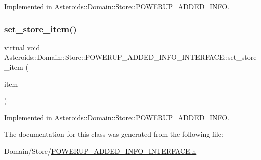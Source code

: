 Implemented in \hyperlink{classAsteroids_1_1Domain_1_1Store_1_1POWERUP__ADDED__INFO_afe8099b9e4266e1dd30e9d2908c17381}{Asteroids\+::\+Domain\+::\+Store\+::\+P\+O\+W\+E\+R\+U\+P\+\_\+\+A\+D\+D\+E\+D\+\_\+\+I\+N\+FO}.

\mbox{\label{classAsteroids_1_1Domain_1_1Store_1_1POWERUP__ADDED__INFO__INTERFACE_a16f5e557d71b54dc716863d619bd1549}} 
\subsubsection{\texorpdfstring{set\+\_\+store\+\_\+item()}{set\_store\_item()}}
{\footnotesize\ttfamily virtual void Asteroids\+::\+Domain\+::\+Store\+::\+P\+O\+W\+E\+R\+U\+P\+\_\+\+A\+D\+D\+E\+D\+\_\+\+I\+N\+F\+O\+\_\+\+I\+N\+T\+E\+R\+F\+A\+C\+E\+::set\+\_\+store\+\_\+item (\begin{DoxyParamCaption}\item[{std\+::shared\+\_\+ptr$<$ \hyperlink{classAsteroids_1_1Domain_1_1Store_1_1STORE__ITEM__INTERFACE}{Asteroids\+::\+Domain\+::\+Store\+::\+S\+T\+O\+R\+E\+\_\+\+I\+T\+E\+M\+\_\+\+I\+N\+T\+E\+R\+F\+A\+CE} $>$}]{item }\end{DoxyParamCaption})\hspace{0.3cm}{\ttfamily [pure virtual]}}



Implemented in \hyperlink{classAsteroids_1_1Domain_1_1Store_1_1POWERUP__ADDED__INFO_ad2b9413bde9663792a39c4bff9503ecf}{Asteroids\+::\+Domain\+::\+Store\+::\+P\+O\+W\+E\+R\+U\+P\+\_\+\+A\+D\+D\+E\+D\+\_\+\+I\+N\+FO}.



The documentation for this class was generated from the following file\+:\begin{DoxyCompactItemize}
\item 
Domain/\+Store/\hyperlink{POWERUP__ADDED__INFO__INTERFACE_8h}{P\+O\+W\+E\+R\+U\+P\+\_\+\+A\+D\+D\+E\+D\+\_\+\+I\+N\+F\+O\+\_\+\+I\+N\+T\+E\+R\+F\+A\+C\+E.\+h}\end{DoxyCompactItemize}
